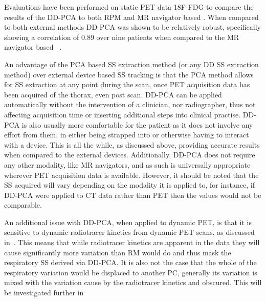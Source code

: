                 Evaluations have been performed on static PET data \gls{18F-FDG} to compare the results of the \gls{DD-PCA} to both \gls{RPM} and \gls{MR} navigator based . When compared to both external methods \gls{DD-PCA} was shown to be relatively robust, specifically showing a correlation of $0.89$ over nine patients when compared to the \gls{MR} navigator based ~\parencite{Thielemans2013ComparisonData, Manber2015PracticalPET/MR}.
                
                An advantage of the \gls{PCA} based \gls{SS} extraction method (or any \gls{DD} \gls{SS} extraction method) over external device based \gls{SS} tracking is that the \gls{PCA} method allows for \gls{SS} extraction at any point during the scan, once \gls{PET} acquisition data has been acquired of the thorax, even post scan. \gls{DD-PCA} can be applied automatically without the intervention of a clinician, nor radiographer, thus not affecting acquisition time or inserting additional steps into clinical practise. \gls{DD-PCA} is also usually more comfortable for the patient as it does not involve any effort from them, in either being strapped into or otherwise having to interact with a device. This is all the while, as discussed above, providing accurate results when compared to the external devices. Additionally, \gls{DD-PCA} does not require any other modality, like \gls{MR} navigators, and as such is universally appropriate wherever \gls{PET} acquisition data is available. However, it should be noted that the \gls{SS} acquired will vary depending on the modality it is applied to, for instance, if \gls{DD-PCA} were applied to \gls{CT} data rather than \gls{PET} then the values would not be comparable.
                
                An additional issue with \gls{DD-PCA}, when applied to dynamic \gls{PET}, is that it is sensitive to dynamic radiotracer kinetics from dynamic \gls{PET} scans, as discussed in~. This means that while radiotracer kinetics are apparent in the data they will cause significantly more variation than \gls{RM} would do and thus mask the respiratory \gls{SS} derived via \gls{DD-PCA}. It is also not the case that the whole of the respiratory variation would be displaced to another \gls{PC}, generally its variation is mixed with the variation cause by the radiotracer kinetics and obscured. This will be investigated further in~
        
